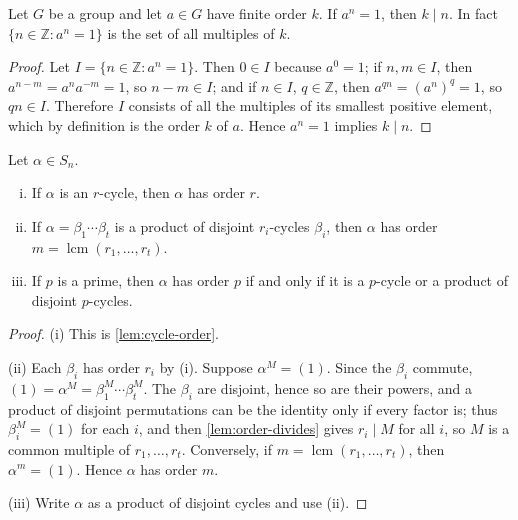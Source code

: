 \begin{lemma}\label{lem:order-divides}
	Let \(G\) be a group and let \(a \in G\) have finite order \(k\). If \(a^n = 1\), then
	\(k \mid n\). In fact \(\{n \in \mathbb{Z} : a^n = 1\}\) is the set of all multiples of
	\(k\).
\end{lemma}

\begin{proof}
	Let \(I = \{n \in \mathbb{Z} : a^n = 1\}\). Then \(0 \in I\) because \(a^0 = 1\); if
	\(n, m \in I\), then \(a^{n-m} = a^n a^{-m} = 1\), so \(n - m \in I\); and if
	\(n \in I\), \(q \in \mathbb{Z}\), then \(a^{qn} = (a^n)^q = 1\), so \(qn \in I\).
	Therefore \(I\) consists of all the multiples of its smallest positive element, which by
	definition is the order \(k\) of \(a\). Hence \(a^n = 1\) implies \(k \mid n\).
\end{proof}

\begin{proposition}\label{prop:order-permutation}
	Let \(\alpha \in S_n\).
	\begin{enumerate}[(i)]
		\item If \(\alpha\) is an \(r\)-cycle, then \(\alpha\) has order \(r\).
		\item If \(\alpha = \beta_1\cdots\beta_t\) is a product of disjoint \(r_i\)-cycles
		      \(\beta_i\), then \(\alpha\) has order
		      \(m = \operatorname{lcm}(r_1, \dots, r_t)\).
		\item If \(p\) is a prime, then \(\alpha\) has order \(p\) if and only if it is a
		      \(p\)-cycle or a product of disjoint \(p\)-cycles.
	\end{enumerate}
\end{proposition}

\begin{proof}
	(i) This is \autoref{lem:cycle-order}.

	(ii) Each \(\beta_i\) has order \(r_i\) by (i). Suppose \(\alpha^M = (1)\). Since the
	\(\beta_i\) commute, \((1) = \alpha^M = \beta_1^M \cdots \beta_t^M\). The \(\beta_i\)
	are disjoint, hence so are their powers, and a product of disjoint permutations can be
	the identity only if every factor is; thus \(\beta_i^M = (1)\) for each \(i\), and then
	\autoref{lem:order-divides} gives
	\(r_i \mid M\) for all \(i\), so \(M\) is a common multiple of \(r_1, \dots, r_t\).
	Conversely, if \(m = \operatorname{lcm}(r_1, \dots, r_t)\), then \(\alpha^m = (1)\).
	Hence \(\alpha\) has order \(m\).

	(iii) Write \(\alpha\) as a product of disjoint cycles and use (ii).
\end{proof}

